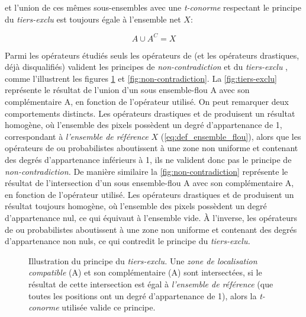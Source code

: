 et l'union de ces mêmes sous-ensembles avec une \emph{t-conorme}
respectant le principe du \emph{tiers-exclu} est toujours égale à
l'ensemble net \(X\):

\begin{equation}
  A \cup A^C = X
\end{equation}

Parmi les opérateurs étudiés seuls les opérateurs de 
(et les opérateurs drastiques, déjà disqualifiés) valident les
principes de \emph{non-contradiction} et du \emph{tiers-exclu}
\autocite{Bouchon-Meunier2007}, comme l'illustrent les figures
\ref{fig:tiers-exclu} et \ref{fig:non-contradiction}. La
\autoref{fig:tiers-exclu} représente le résultat de l'union d'un sous
ensemble-flou \textcolor{RdBu-9-1}{\textsf{A}} avec son complémentaire
\textcolor{RdBu-9-9}{\textsf{A}}, en fonction de l'opérateur
utilisé. On peut remarquer deux comportements distincts. Les
opérateurs drastiques et de  produisent un résultat
homogène, où l'ensemble des pixels possèdent un degré d'appartenance
de 1, correspondant à \emph{l'ensemble de référence} \(X\)
(\autoref{eq:def_ensemble_flou}), alors que les opérateurs de
 ou probabilistes aboutissent à une zone non uniforme et
contenant des degrés d'appartenance inférieurs à 1, ils ne valident
donc pas le principe de \emph{non-contradiction.} De manière similaire
la \autoref{fig:non-contradiction} représente le résultat de
l'intersection d'un sous ensemble-flou
\textcolor{RdBu-9-1}{\textsf{A}} avec son complémentaire
\textcolor{RdBu-9-9}{\textsf{A}}, en fonction de l'opérateur
utilisé. Les opérateurs drastiques et de  produisent
un résultat toujours homogène, où l'ensemble des pixels possèdent un
degré d'appartenance nul, ce qui équivaut à l'ensemble vide. À
l'inverse, les opérateurs de  ou probabilistes aboutissent
à une zone non uniforme et contenant des degrés d'appartenance non
nuls, ce qui contredit le principe du \emph{tiers-exclu.}

\begin{figure}
  \centering
  
  \caption[Illustration du principe du
  \emph{tiers-exclu}]{Illustration du principe du \emph{tiers-exclu.}
    Une \emph{zone de localisation compatible}
    (\textcolor{RdBu-9-1}{\textsf{A}}) et son complémentaire
    (\textcolor{RdBu-9-9}{\textsf{A}}) sont intersectées, si le
    résultat de cette intersection est égal à \emph{l'ensemble de
      référence} (\ie que toutes les positions ont un degré
    d'appartenance de 1), alors la \emph{t-conorme} utilisée valide ce
    principe.}
  \label{fig:tiers-exclu}
\end{figure}

